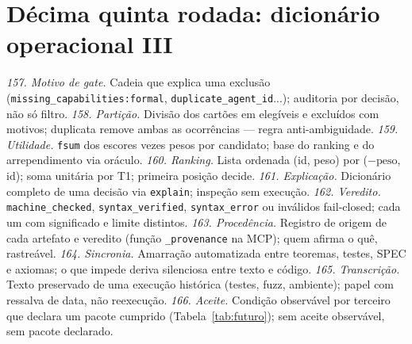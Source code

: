 \section{Décima quinta rodada: dicionário operacional III}
\textit{157. Motivo de gate.} Cadeia que explica uma exclusão (\texttt{missing\_capabilities:formal}, \texttt{duplicate\_agent\_id}...); auditoria por decisão, não só filtro.
\textit{158. Partição.} Divisão dos cartões em elegíveis e excluídos com motivos; duplicata remove ambas as ocorrências --- regra anti-ambiguidade.
\textit{159. Utilidade.} \texttt{fsum} dos escores vezes pesos por candidato; base do ranking e do arrependimento via oráculo.
\textit{160. Ranking.} Lista ordenada (id, peso) por ($-\mathrm{peso}$, $\mathrm{id}$); soma unitária por T1; primeira posição decide.
\textit{161. Explicação.} Dicionário completo de uma decisão via \texttt{explain}; inspeção sem execução.
\textit{162. Veredito.} \texttt{machine\_checked}, \texttt{syntax\_verified}, \texttt{syntax\_error} ou inválidos fail-closed; cada um com significado e limite distintos.
\textit{163. Procedência.} Registro de origem de cada artefato e veredito (função \texttt{\_provenance} na MCP); quem afirma o quê, rastreável.
\textit{164. Sincronia.} Amarração automatizada entre teoremas, testes, SPEC e axiomas; o que impede deriva silenciosa entre texto e código.
\textit{165. Transcrição.} Texto preservado de uma execução histórica (testes, fuzz, ambiente); papel com ressalva de data, não reexecução.
\textit{166. Aceite.} Condição observável por terceiro que declara um pacote cumprido (Tabela~\ref{tab:futuro}); sem aceite observável, sem pacote declarado.

